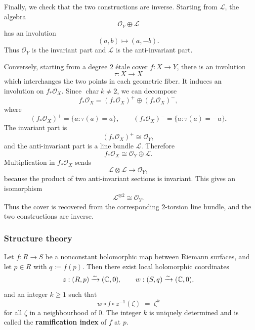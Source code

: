 \documentclass[12pt]{article}
\begin{document}
\begin{solution}
    Finally, we check that the two constructions are inverse. Starting from \(\mathcal L\), the algebra
    \[
        \mathcal O_Y\oplus \mathcal L
    \]
    has an involution
    \[
        (a,b)\mapsto (a,-b).
    \]
    Thus \(\mathcal O_Y\) is the invariant part and \(\mathcal L\) is the anti-invariant part.

    Conversely, starting from a degree \(2\) étale cover \(f:X\to Y\), there is an involution
    \[
        \tau:X\to X
    \]
    which interchanges the two points in each geometric fiber. It induces an involution on \(f_*\mathcal O_X\). Since \(\operatorname{char} k\neq 2\), we can decompose
    \[
        f_*\mathcal O_X
        =
        (f_*\mathcal O_X)^+
        \oplus
        (f_*\mathcal O_X)^-,
    \]
    where
    \[
        (f_*\mathcal O_X)^+
        =
        \{a:\tau(a)=a\},
        \qquad
        (f_*\mathcal O_X)^-
        =
        \{a:\tau(a)=-a\}.
    \]
    The invariant part is
    \[
        (f_*\mathcal O_X)^+\cong \mathcal O_Y,
    \]
    and the anti-invariant part is a line bundle \(\mathcal L\). Therefore
    \[
        f_*\mathcal O_X\cong \mathcal O_Y\oplus \mathcal L.
    \]
    Multiplication in \(f_*\mathcal O_X\) sends
    \[
        \mathcal L\otimes \mathcal L\to \mathcal O_Y,
    \]
    because the product of two anti-invariant sections is invariant. This gives an isomorphism
    \[
        \mathcal L^{\otimes 2}\cong \mathcal O_Y.
    \]
    Thus the cover is recovered from the corresponding \(2\)-torsion line bundle, and the two constructions are inverse.
\end{solution}

\subsubsection{Structure theory}

\begin{theorem}
    Let $f : R \to S$ be a nonconstant holomorphic map between Riemann surfaces,
    and let $p \in R$ with $q := f(p)$. Then there exist local holomorphic
    coordinates
    \[
        z : (R,p) \xrightarrow{\sim} (\mathbb{C},0),
        \qquad
        w : (S,q) \xrightarrow{\sim} (\mathbb{C},0),
    \]
    and an integer $k \ge 1$ such that
    \[
        w \circ f \circ z^{-1}(\zeta) \;=\; \zeta^k
    \]
    for all $\zeta$ in a neighbourhood of $0$. The integer $k$ is uniquely
    determined and is called the \textbf{ramification index} of $f$ at $p$.
\end{theorem}
\end{document}
